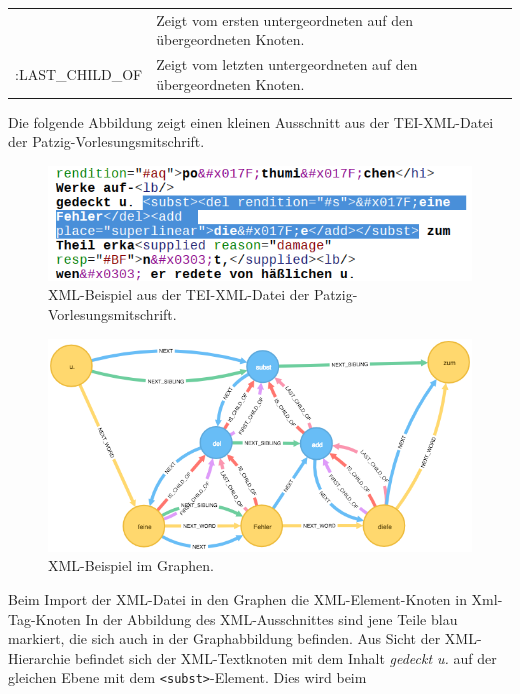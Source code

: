 \documentclass[ngerman,]{scrreprt}
\begin{document}
\begin{longtable}[]{@{}ll@{}}
\begin{minipage}[t]{0.22\columnwidth}
\end{minipage} & \begin{minipage}[t]{0.72\columnwidth}\raggedright\strut
Zeigt vom ersten untergeordneten auf den übergeordneten Knoten.\strut
\end{minipage}\tabularnewline
\begin{minipage}[t]{0.22\columnwidth}\raggedright\strut
:LAST\_CHILD\_OF\strut
\end{minipage} & \begin{minipage}[t]{0.72\columnwidth}\raggedright\strut
Zeigt vom letzten untergeordneten auf den übergeordneten Knoten.\strut
\end{minipage}\tabularnewline
\bottomrule
\end{longtable}

Die folgende Abbildung zeigt einen kleinen Ausschnitt aus der TEI-XML-Datei der Patzig-Vorlesungsmitschrift.

\begin{figure}
\centering
\includegraphics{Bilder/TEI2Graph/subst-xml-Beispiel.png}
\caption{XML-Beispiel aus der TEI-XML-Datei der Patzig-Vorlesungsmitschrift.}
\end{figure}

\begin{figure}
\centering
\includegraphics{Bilder/TEI2Graph/xml-importer-datenmodell.png}
\caption{XML-Beispiel im Graphen.}
\end{figure}

Beim Import der XML-Datei in den Graphen die XML-Element-Knoten in Xml-Tag-Knoten In der Abbildung des XML-Ausschnittes sind jene Teile blau markiert, die sich auch in der Graphabbildung befinden. Aus Sicht der XML-Hierarchie befindet sich der XML-Textknoten mit dem Inhalt \emph{gedeckt u.} auf der gleichen Ebene mit dem \texttt{\textless{}subst\textgreater{}}-Element. Dies wird beim
\end{document}
